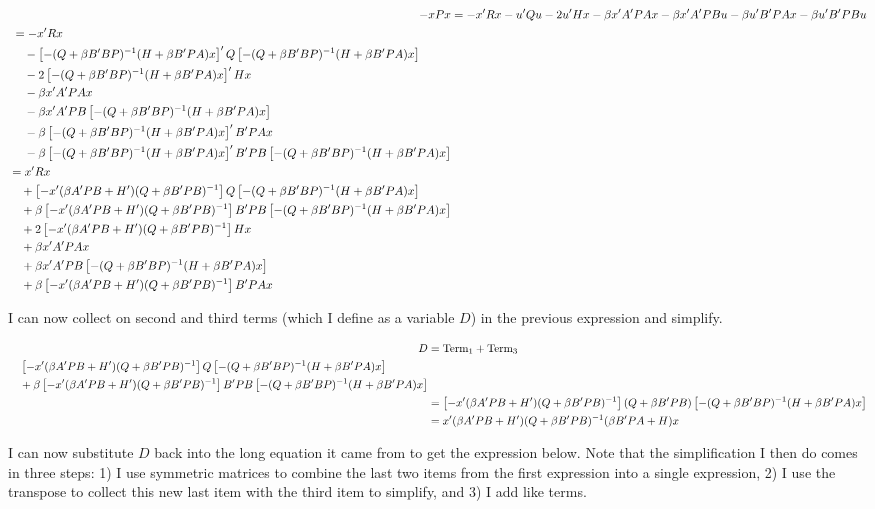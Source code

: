 \begin{homeworkProblem}[Problem 5.1]
{\begin{enumerate}[a.]
        \begin{align*}
          -x P x &= -x'Rx - u'Qu - 2u'Hx - \beta x'A'PAx - \beta x'A'PBu - \beta u'B'PAx - \beta u'B'PBu \\
          \begin{split}
            &= -x'Rx \\
            &\quad- \pu'Q\pu \\
            &\quad - 2\pu'Hx \\
            & \quad - \beta x'A'PAx \\
            & \quad - \beta x'A'PB\pu \\
            & \quad - \beta \pu'B'PAx \\
            & \quad - \beta \pu'B'PB \pu
          \end{split} \\
          \begin{split}
            &= x'Rx \\
            &\quad + \puprime Q\pu \\
            & \quad + \beta \puprime B'PB \pu \\
            &\quad + 2\puprime Hx \\
            & \quad + \beta x'A'PAx \\
            & \quad + \beta x'A'PB\pu \\
            & \quad + \beta \puprime B'PAx
          \end{split} \\
        \end{align*}

        I can now collect on second and third terms (which I define as a variable $D$) in the previous expression and simplify.

        \begin{align*}
          D &= \text{Term}_1 + \text{Term}_3 \\
            \begin{split}
              &\quad\puprime Q\pu \\
              &\quad +\beta \puprime B'PB \pu
            \end{split} \\
              &= \puprime (Q + \beta B'PB)\pu \\
              &= x'(\beta A'PB + H')(Q + \beta B'PB)^{-1}(\beta B'PA + H) x
        \end{align*}

        I can now substitute $D$ back into the long equation it came from to get the expression below. Note that the simplification I then do comes in three steps: 1) I use symmetric matrices to combine the last two items from the first expression into a single expression, 2) I use the transpose to collect this new last item with the third item to simplify, and 3) I add like terms.


\end{enumerate}}
\end{homeworkProblem}
